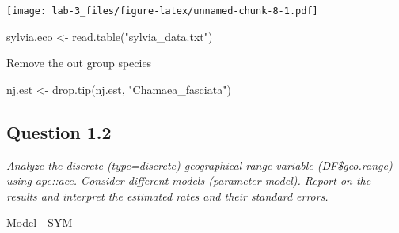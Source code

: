 \documentclass[
]{article}
\newenvironment{Shaded}{\begin{snugshade}}{\end{snugshade}}
\newcommand{\AttributeTok}[1]{\textcolor[rgb]{0.77,0.63,0.00}{#1}}
\newcommand{\CommentTok}[1]{\textcolor[rgb]{0.56,0.35,0.01}{\textit{#1}}}
\newcommand{\FunctionTok}[1]{\textcolor[rgb]{0.00,0.00,0.00}{#1}}
\newcommand{\NormalTok}[1]{#1}
\newcommand{\OtherTok}[1]{\textcolor[rgb]{0.56,0.35,0.01}{#1}}
\newcommand{\SpecialCharTok}[1]{\textcolor[rgb]{0.00,0.00,0.00}{#1}}
\newcommand{\StringTok}[1]{\textcolor[rgb]{0.31,0.60,0.02}{#1}}
\begin{document}
\texttt{[image: lab-3\_files/figure-latex/unnamed-chunk-8-1.pdf]}

\begin{Shaded}
\begin{Highlighting}[]
\NormalTok{sylvia.eco }\OtherTok{\textless{}{-}} \FunctionTok{read.table}\NormalTok{(}\StringTok{"sylvia\_data.txt"}\NormalTok{)}
\end{Highlighting}
\end{Shaded}

Remove the out group species

\begin{Shaded}
\begin{Highlighting}[]
\NormalTok{nj.est }\OtherTok{\textless{}{-}} \FunctionTok{drop.tip}\NormalTok{(nj.est, }\StringTok{"Chamaea\_fasciata"}\NormalTok{)}
\end{Highlighting}
\end{Shaded}

\hypertarget{question-1.2}{%
\subsection{Question 1.2}\label{question-1.2}}

\emph{Analyze the discrete (type=discrete) geographical range variable
(DF\$geo.range) using ape::ace. Consider different models (parameter
model). Report on the results and interpret the estimated rates and
their standard errors.}

\begin{Shaded}
\end{Shaded}

Model - SYM

\begin{Shaded}
\end{Shaded}
\end{document}
